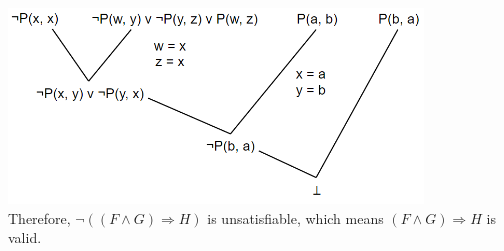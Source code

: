 \documentclass{article}
\begin{document}
\begin{enumerate}
    \includegraphics[width=11cm]{res}\\
    Therefore, $\neg ((F \wedge G) \Rightarrow H)$ is unsatisfiable, which means $(F \wedge G) \Rightarrow H$ is valid.
\end{enumerate}
\end{document}

